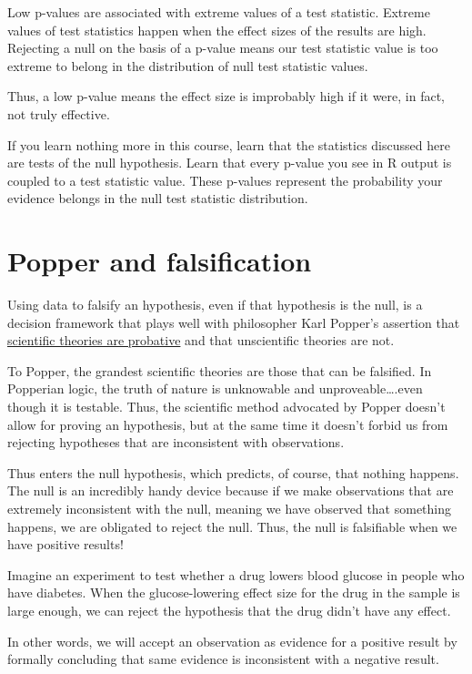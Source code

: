 \documentclass[]{book}
\begin{document}
Low p-values are associated with extreme values of a test statistic. Extreme values of test statistics happen when the effect sizes of the results are high. Rejecting a null on the basis of a p-value means our test statistic value is too extreme to belong in the distribution of null test statistic values.

Thus, a low p-value means the effect size is improbably high if it were, in fact, not truly effective.

If you learn nothing more in this course, learn that the statistics discussed here are tests of the null hypothesis. Learn that every p-value you see in R output is coupled to a test statistic value. These p-values represent the probability your evidence belongs in the null test statistic distribution.

\hypertarget{popper-and-falsification}{%
\section{Popper and falsification}\label{popper-and-falsification}}

Using data to falsify an hypothesis, even if that hypothesis is the null, is a decision framework that plays well with philosopher Karl Popper's assertion that \href{https://plato.stanford.edu/entries/popper/\#ProbDema}{scientific theories are probative} and that unscientific theories are not.

To Popper, the grandest scientific theories are those that can be falsified. In Popperian logic, the truth of nature is unknowable and unproveable\ldots{}.even though it is testable. Thus, the scientific method advocated by Popper doesn't allow for proving an hypothesis, but at the same time it doesn't forbid us from rejecting hypotheses that are inconsistent with observations.

Thus enters the null hypothesis, which predicts, of course, that nothing happens. The null is an incredibly handy device because if we make observations that are extremely inconsistent with the null, meaning we have observed that something happens, we are obligated to reject the null. Thus, the null is falsifiable when we have positive results!

Imagine an experiment to test whether a drug lowers blood glucose in people who have diabetes. When the glucose-lowering effect size for the drug in the sample is large enough, we can reject the hypothesis that the drug didn't have any effect.

In other words, we will accept an observation as evidence for a positive result by formally concluding that same evidence is inconsistent with a negative result.
\end{document}
